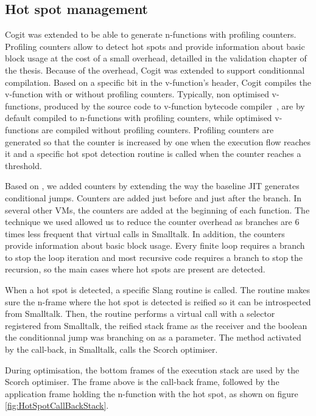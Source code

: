 \documentclass[a4paper,12pt,twoside]{../includes/ThesisStyle}
\begin{document}
\subsection{Hot spot management}

Cogit was extended to be able to generate n-functions with profiling counters. Profiling counters allow to detect hot spots and provide information about basic block usage at the cost of a small overhead, detailled in the validation chapter of the thesis. Because of the overhead, Cogit was extended to support conditionnal compilation. Based on a specific bit in the v-function's header, Cogit compiles the v-function with or without profiling counters. Typically, non optimised v-functions, produced by the source code to v-function bytecode compiler~\cite{Bera13a}, are by default compiled to n-functions with profiling counters, while optimised v-functions are compiled without profiling counters. Profiling counters are generated so that the counter is increased by one when the execution flow reaches it and a specific hot spot detection routine is called when the counter reaches a threshold.


Based on \cite{Arn02}, we added counters by extending the way the baseline JIT generates conditional jumps. Counters are added just before and just after the branch. In several other VMs, the counters are added at the beginning of each function. The technique we used allowed us to reduce the counter overhead as branches are 6 times less frequent that virtual calls in Smalltalk. In addition, the counters provide information about basic block usage. Every finite loop requires a branch to stop the loop iteration and most recursive code requires a branch to stop the recursion, so the main cases where hot spots are present are detected.

When a hot spot is detected, a specific Slang routine is called. The routine makes sure the n-frame where the hot spot is detected is reified so it can be introspected from Smalltalk. Then, the routine performs a virtual call with a selector registered from Smalltalk, the reified stack frame as the receiver and the boolean the conditionnal jump was branching on as a parameter. The method activated by the call-back, in Smalltalk, calls the Scorch optimiser.

During optimisation, the bottom frames of the execution stack are used by the Scorch optimiser. The frame above is the call-back frame, followed by the application frame holding the n-function with the hot spot, as shown on figure \ref{fig:HotSpotCallBackStack}.
\end{document}

